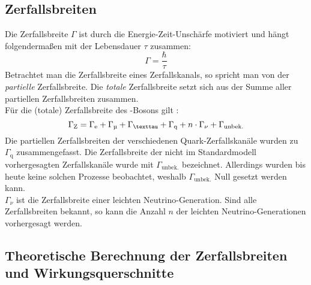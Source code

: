 \subsection{Zerfallsbreiten}
\label{sub:theo:gamma}
Die Zerfallsbreite $\Gamma$ ist durch die Energie-Zeit-Unschärfe motiviert und hängt folgendermaßen mit der Lebensdauer $\tau$ zusammen:
\begin{equation}
    \Gamma = \frac{\hbar}{\tau}
\end{equation}
Betrachtet man die Zerfallsbreite eines Zerfallskanals, so spricht man von der \emph{partielle} Zerfallsbreite. Die \emph{totale} Zerfallsbreite
setzt sich aus der Summe aller partiellen Zerfallsbreiten zusammen. \\
Für die (totale) Zerfallsbreite des \Z-Bosons gilt \cite{manual}:
\begin{equation}
    \Gamma_\text{Z} = \Gamma_\text{e} + \Gamma_\text{\textmu} + \Gamma_\text{\texttau} + \Gamma_\text{q} + n \cdot \Gamma_\nu + \Gamma_\text{unbek.}
\end{equation}
Die partiellen Zerfallsbreiten der verschiedenen Quark-Zerfallskanäle wurden zu $\Gamma_\text{q}$ zusammengefasst. Die Zerfallsbreite der
nicht im Standardmodell vorhergesagten Zerfallskanäle wurde mit $\Gamma_\text{unbek.}$ bezeichnet. Allerdings wurden bis heute keine solchen
Prozesse beobachtet, weshalb $\Gamma_\text{unbek.}$ Null gesetzt werden kann.\\
$\Gamma_\nu$ ist die Zerfallsbreite einer leichten Neutrino-Generation. Sind alle Zerfallsbreiten bekannt, so kann die Anzahl $n$ der leichten
Neutrino-Generationen vorhergesagt werden.

\subsection{Theoretische Berechnung der Zerfallsbreiten und Wirkungsquerschnitte}
